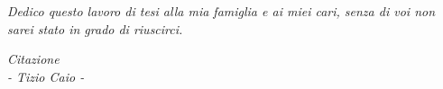 \vspace{5em}
\begin{flushright}
  {\normalsize \textit{Dedico questo lavoro di tesi alla mia famiglia e ai miei cari, senza di voi non sarei stato in grado di riuscirci.}}\\
\end{flushright}

\clearpage{\pagestyle{empty}\cleardoublepage}

\vspace*{30mm}
\begin{flushright}
    \textit{\large Citazione 
        \\ \vspace{5mm}  - Tizio Caio -}
\end{flushright}
    
\vfill

\clearpage{\pagestyle{empty}\cleardoublepage}
